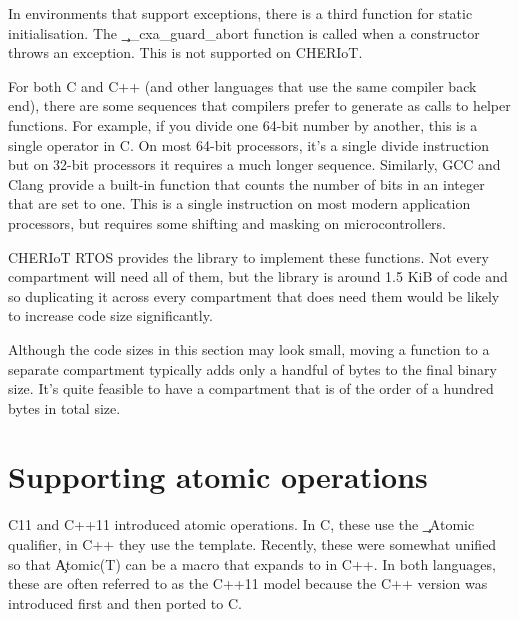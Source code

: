 \begin{note}
In environments that support exceptions, there is a third function for static initialisation.
The \c{__cxa_guard_abort} function is called when a constructor throws an exception.
This is not supported on CHERIoT.
\end{note}

For both C and C++ (and other languages that use the same compiler back end), there are some sequences that compilers prefer to generate as calls to helper functions.
For example, if you divide one 64-bit number by another, this is a single operator in C.
On most 64-bit processors, it's a single divide instruction but on 32-bit processors it requires a much longer sequence.
Similarly, GCC and Clang provide a  built-in function that counts the number of bits in an integer that are set to one.
This is a single instruction on most modern application processors, but requires some shifting and masking on microcontrollers.

CHERIoT RTOS provides the  library to implement these functions.
Not every compartment will need all of them, but the library is around 1.5 KiB of code and so duplicating it across every compartment that does need them would be likely to increase code size significantly.

Although the code sizes in this section may look small, moving a function to a separate compartment typically adds only a handful of bytes to the final binary size.
It's quite feasible to have a compartment that is of the order of a hundred bytes in total size.

\section{Supporting atomic operations}

C11 and C++11 introduced atomic operations.
In C, these use the \c{_Atomic} qualifier, in C++ they use the  template.
Recently, these were somewhat unified so that \c{Atomic(T)} can be a macro that expands to  in C++.
In both languages, these are often referred to as the C++11 model because the C++ version was introduced first and then ported to C.

